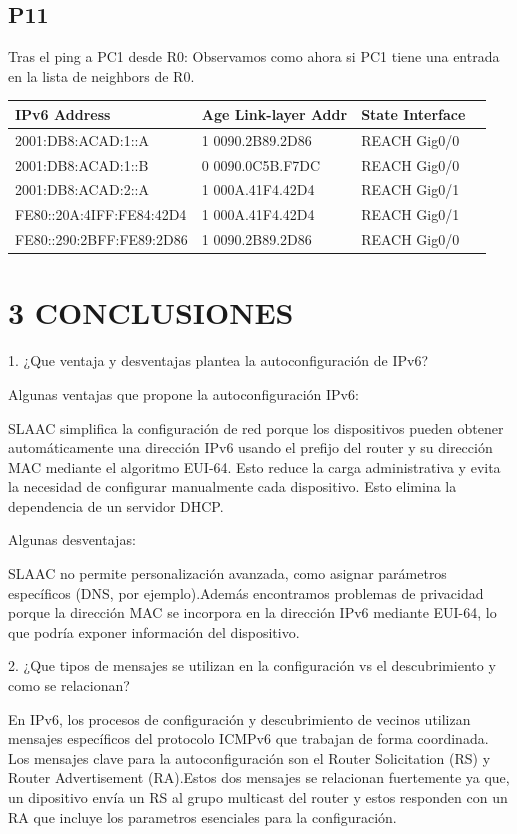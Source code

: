 \documentclass{article}
\begin{document}
\subsection*{P11}
Tras el ping a PC1 desde R0: Observamos como ahora si PC1 tiene una entrada en la lista de neighbors de R0.

\begin{tabular}{|l|l|l|l|}
\hline
IPv6 Address & Age Link-layer Addr & State Interface \\
\hline
2001:DB8:ACAD:1::A & 1 0090.2B89.2D86 & REACH Gig0/0 \\
2001:DB8:ACAD:1::B & 0 0090.0C5B.F7DC & REACH Gig0/0 \\
2001:DB8:ACAD:2::A & 1 000A.41F4.42D4 & REACH Gig0/1 \\
FE80::20A:4IFF:FE84:42D4 & 1 000A.41F4.42D4 & REACH Gig0/1 \\
FE80::290:2BFF:FE89:2D86 & 1 0090.2B89.2D86 & REACH Gig0/0 \\
\hline
\end{tabular}

\section*{3 CONCLUSIONES}
1. ¿Que ventaja y desventajas plantea la autoconfiguración de IPv6?

Algunas ventajas que propone la autoconfiguración IPv6:

SLAAC simplifica la configuración de red porque los dispositivos pueden obtener automáticamente una dirección IPv6 usando el prefijo del router y su dirección MAC mediante el algoritmo EUI-64. Esto reduce la carga administrativa y evita la necesidad de configurar manualmente cada dispositivo. Esto elimina la dependencia de un servidor DHCP.

Algunas desventajas:

SLAAC no permite personalización avanzada, como asignar parámetros específicos (DNS, por ejemplo).Además encontramos problemas de privacidad porque la dirección MAC se incorpora en la dirección IPv6 mediante EUI-64, lo que podría exponer información del dispositivo.

2. ¿Que tipos de mensajes se utilizan en la configuración vs el descubrimiento y como se relacionan?

En IPv6, los procesos de configuración y descubrimiento de vecinos utilizan mensajes específicos del protocolo ICMPv6 que trabajan de forma coordinada. Los mensajes clave para la autoconfiguración son el Router Solicitation (RS) y Router Advertisement (RA).Estos dos mensajes se relacionan fuertemente ya que, un dipositivo envía un RS al grupo multicast del router y estos responden con un RA que incluye los parametros esenciales para la configuración.
\end{document}
